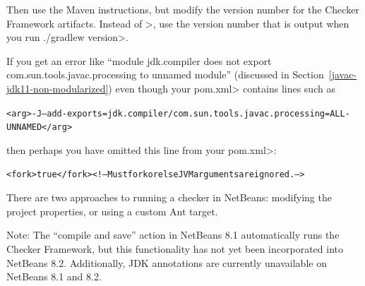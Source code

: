 \noindent
Then use the Maven instructions, but modify the version number for the
Checker Framework artifacts.  Instead of \<\ReleaseVersion{}>, use the
version number that is output when you run \<./gradlew version>.



If you get an error like ``module jdk.compiler does not export
com.sun.tools.javac.processing to unnamed module'' (discussed in
Section~\ref{javac-jdk11-non-modularized}) even though your \<pom.xml>
contains lines such as

\begin{mysmall}
\begin{alltt}
  <arg>-J--add-exports=jdk.compiler/com.sun.tools.javac.processing=ALL-UNNAMED</arg>
\end{alltt}
\end{mysmall}

\noindent
then perhaps you have omitted this line from your \<pom.xml>:

\begin{mysmall}
\begin{alltt}
          <fork>true</fork> <!-- Must fork or else JVM arguments are ignored. -->
\end{alltt}
\end{mysmall}



There are two approaches to running a checker in NetBeans:  modifying the
project properties, or using a custom Ant target.

Note: The ``compile and save'' action in NetBeans 8.1 automatically
runs the Checker Framework, but this functionality has not yet
been incorporated into NetBeans 8.2. Additionally, JDK annotations
are currently unavailable on NetBeans 8.1 and 8.2.




